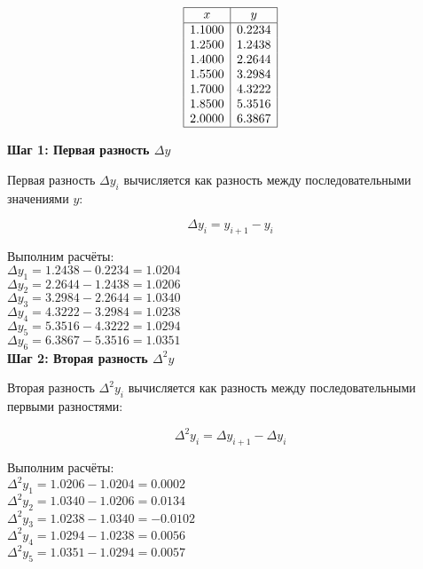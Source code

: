 \documentclass{article}
\begin{document}
                  \[
                  \begin{array}{|c|c|}
                  \hline
                  x & y \\
                  \hline
                  1.1000 & 0.2234 \\
                  1.2500 & 1.2438 \\
                  1.4000 & 2.2644 \\
                  1.5500 & 3.2984 \\
                  1.7000 & 4.3222 \\
                  1.8500 & 5.3516 \\
                  2.0000 & 6.3867 \\
                  \hline
                  \end{array}
                  \]

                  \textbf{Шаг 1: Первая разность \(\Delta y\)}

                  Первая разность \(\Delta y_i\) вычисляется как разность между последовательными значениями \(y\):

                  \[
                  \Delta y_i = y_{i+1} - y_i
                  \]

                  Выполним расчёты:
                  \\
                  \(\Delta y_1 = 1.2438 - 0.2234 = 1.0204\) \\
                  \(\Delta y_2 = 2.2644 - 1.2438 = 1.0206\) \\
                  \(\Delta y_3 = 3.2984 - 2.2644 = 1.0340\) \\
                  \(\Delta y_4 = 4.3222 - 3.2984 = 1.0238\) \\
                  \(\Delta y_5 = 5.3516 - 4.3222 = 1.0294\) \\
                  \(\Delta y_6 = 6.3867 - 5.3516 = 1.0351\) \\

                  \textbf{Шаг 2: Вторая разность \(\Delta^2 y\)}

                  Вторая разность \(\Delta^2 y_i\) вычисляется как разность между последовательными первыми разностями:

                  \[
                  \Delta^2 y_i = \Delta y_{i+1} - \Delta y_i
                  \]

                  Выполним расчёты:
                  \\
                  \(\Delta^2 y_1 = 1.0206 - 1.0204 = 0.0002\) \\
                  \(\Delta^2 y_2 = 1.0340 - 1.0206 = 0.0134\) \\
                  \(\Delta^2 y_3 = 1.0238 - 1.0340 = -0.0102\) \\
                  \(\Delta^2 y_4 = 1.0294 - 1.0238 = 0.0056\) \\
                  \(\Delta^2 y_5 = 1.0351 - 1.0294 = 0.0057\) \\
\end{document}
